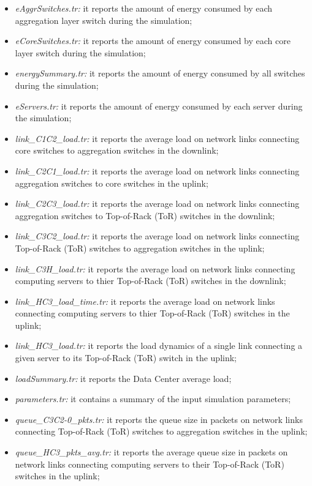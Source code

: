 \begin{itemize}
    \item \emph{eAggrSwitches.tr:} it reports the amount of energy consumed by each aggregation layer switch during the simulation;
    \item \emph{eCoreSwitches.tr:} it reports the amount of energy consumed by each core layer switch during the simulation;
    \item \emph{energySummary.tr:} it reports the amount of energy consumed by all switches during the simulation;
    \item \emph{eServers.tr:} it reports the amount of energy consumed by each server during the simulation;
    \item \emph{link\_C1C2\_load.tr:} it reports the average load on network links connecting core switches to aggregation switches in the downlink;
    \item \emph{link\_C2C1\_load.tr:} it reports the average load on network links connecting aggregation switches to core switches in the uplink;
    \item \emph{link\_C2C3\_load.tr:} it reports the average load on network links connecting aggregation switches to Top-of-Rack (ToR) switches in the downlink;
    \item \emph{link\_C3C2\_load.tr:} it reports the average load on network links connecting Top-of-Rack (ToR) switches to aggregation switches in the uplink;
    \item \emph{link\_C3H\_load.tr:} it reports the average load on network links connecting computing servers to thier Top-of-Rack (ToR) switches in the downlink;
    \item \emph{link\_HC3\_load\_time.tr:} it reports the average load on network links connecting computing servers to thier Top-of-Rack (ToR) switches in the uplink; 
    \item \emph{link\_HC3\_load.tr:} it reports the load dynamics of a single link connecting a given server to its Top-of-Rack (ToR) switch in the uplink; 
    \item \emph{loadSummary.tr:} it reports the Data Center average load;
    \item \emph{parameters.tr:} it contains a summary of the input simulation parameters;
    \item \emph{queue\_C3C2-0\_pkts.tr:} it reports the queue size in packets on network links connecting Top-of-Rack (ToR) switches to aggregation switches in the uplink;
    \item \emph{queue\_HC3\_pkts\_avg.tr:} it reports the average queue size in packets on network links connecting computing servers to their Top-of-Rack (ToR) switches in the uplink;

\end{itemize}
